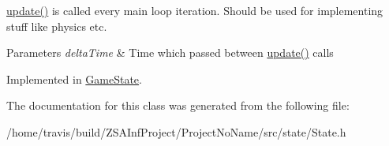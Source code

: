 \hyperlink{classState_af2121f8eb52144b7a789214f15e3601a}{update()} is called every main loop iteration. Should be used for implementing stuff like physics etc. 
\begin{DoxyParams}{Parameters}
{\em delta\-Time} & Time which passed between \hyperlink{classState_af2121f8eb52144b7a789214f15e3601a}{update()} calls \\
\hline
\end{DoxyParams}


Implemented in \hyperlink{classGameState_aba059d7ab1a53b8f5d795292ed37abac}{Game\-State}.



The documentation for this class was generated from the following file\-:\begin{DoxyCompactItemize}
\item 
/home/travis/build/\-Z\-S\-A\-Inf\-Project/\-Project\-No\-Name/src/state/State.\-h\end{DoxyCompactItemize}
